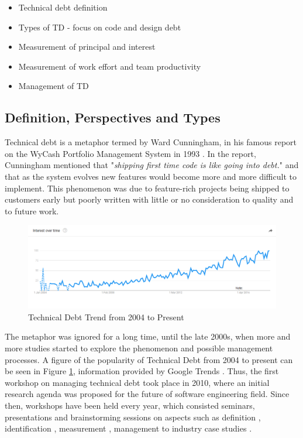 \documentclass{mprop}
\begin{document}
\begin{itemize}
	\item Technical debt definition
	\item Types of TD - focus on code and design debt
	\item Measurement of principal and interest
	\item Measurement of work effort and team productivity
	\item Management of TD
\end{itemize}

\subsection{Definition, Perspectives and Types}

Technical debt is a metaphor termed by Ward Cunningham, in his famous report on
the WyCash Portfolio Management System in 1993 \cite{Cunningham1993}. In the
report, Cunningham mentioned that "\textit{shipping first time code is like
	going into debt.}" and that as the system evolves new features would become more
and more difficult to implement. This phenomenon was due to feature-rich
projects being shipped to customers early but poorly written with little or no
consideration to quality and to future work.

\begin{figure}
	\centering
	\includegraphics[width=\linewidth]{visualisations/TD_trend.png}
	\caption{Technical Debt Trend from 2004 to Present}
	\label{fig:td-trend}
\end{figure}

The metaphor was ignored for a long time, until the late 2000s, when more and
more studies started to explore the phenomenon and possible management
processes. A figure of the popularity of Technical Debt from 2004 to present can
be seen in Figure \ref{fig:td-trend}, information provided by Google Trends
\cite{GoogleTrends}. Thus, the first workshop on managing technical debt took
place in 2010, where an initial research agenda was proposed for the future of
software engineering field. Since then, workshops have been held every year,
which consisted seminars, presentations and brainstorming sessions on aspects
such as definition \cite{Kruchten2012} \cite{Theodoropoulos2011}
\cite{Schmid2013}, identification \cite{Ernst2012}, measurement
\cite{Letouzey2012} \cite{Curtis2012} \cite{Nugroho2011} \cite{Zazworka2011}
\cite{Fontana2012} \cite{Bohnet2011}, management \cite{Guo2011}
\cite{Zazworka2011Prioritise} \cite{Seaman2012} to industry case studies
\cite{Lim2012} \cite{Morgenthaler2012} \cite{Codabux2013} \cite{Holvitie2014}
\cite{Klinger2011}.
\end{document}
